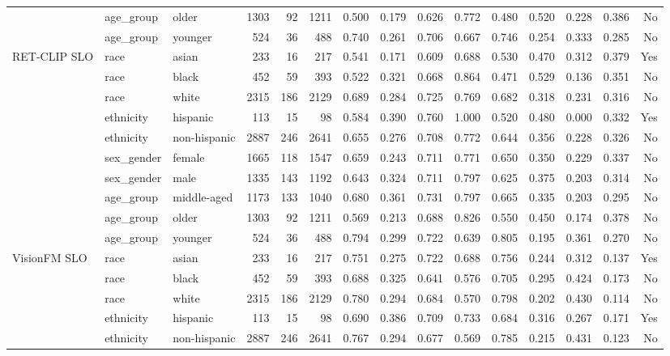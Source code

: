 \begin{longtable}{@{}lllrrrrrrrrrrrr@{}}
 & age\_group & older & 1303 & 92 & 1211 & 0.500 & 0.179 & 0.626 & 0.772 & 0.480 & 0.520 & 0.228 & 0.386 & No \\
 & age\_group & younger & 524 & 36 & 488 & 0.740 & 0.261 & 0.706 & 0.667 & 0.746 & 0.254 & 0.333 & 0.285 & No \\
RET-CLIP SLO & race & asian & 233 & 16 & 217 & 0.541 & 0.171 & 0.609 & 0.688 & 0.530 & 0.470 & 0.312 & 0.379 & Yes \\
 & race & black & 452 & 59 & 393 & 0.522 & 0.321 & 0.668 & 0.864 & 0.471 & 0.529 & 0.136 & 0.351 & No \\
 & race & white & 2315 & 186 & 2129 & 0.689 & 0.284 & 0.725 & 0.769 & 0.682 & 0.318 & 0.231 & 0.316 & No \\
 & ethnicity & hispanic & 113 & 15 & 98 & 0.584 & 0.390 & 0.760 & 1.000 & 0.520 & 0.480 & 0.000 & 0.332 & Yes \\
 & ethnicity & non-hispanic & 2887 & 246 & 2641 & 0.655 & 0.276 & 0.708 & 0.772 & 0.644 & 0.356 & 0.228 & 0.326 & No \\
 & sex\_gender & female & 1665 & 118 & 1547 & 0.659 & 0.243 & 0.711 & 0.771 & 0.650 & 0.350 & 0.229 & 0.337 & No \\
 & sex\_gender & male & 1335 & 143 & 1192 & 0.643 & 0.324 & 0.711 & 0.797 & 0.625 & 0.375 & 0.203 & 0.314 & No \\
 & age\_group & middle-aged & 1173 & 133 & 1040 & 0.680 & 0.361 & 0.731 & 0.797 & 0.665 & 0.335 & 0.203 & 0.295 & No \\
 & age\_group & older & 1303 & 92 & 1211 & 0.569 & 0.213 & 0.688 & 0.826 & 0.550 & 0.450 & 0.174 & 0.378 & No \\
 & age\_group & younger & 524 & 36 & 488 & 0.794 & 0.299 & 0.722 & 0.639 & 0.805 & 0.195 & 0.361 & 0.270 & No \\
VisionFM SLO & race & asian & 233 & 16 & 217 & 0.751 & 0.275 & 0.722 & 0.688 & 0.756 & 0.244 & 0.312 & 0.137 & Yes \\
 & race & black & 452 & 59 & 393 & 0.688 & 0.325 & 0.641 & 0.576 & 0.705 & 0.295 & 0.424 & 0.173 & No \\
 & race & white & 2315 & 186 & 2129 & 0.780 & 0.294 & 0.684 & 0.570 & 0.798 & 0.202 & 0.430 & 0.114 & No \\
 & ethnicity & hispanic & 113 & 15 & 98 & 0.690 & 0.386 & 0.709 & 0.733 & 0.684 & 0.316 & 0.267 & 0.171 & Yes \\
 & ethnicity & non-hispanic & 2887 & 246 & 2641 & 0.767 & 0.294 & 0.677 & 0.569 & 0.785 & 0.215 & 0.431 & 0.123 & No \\

\end{longtable}
